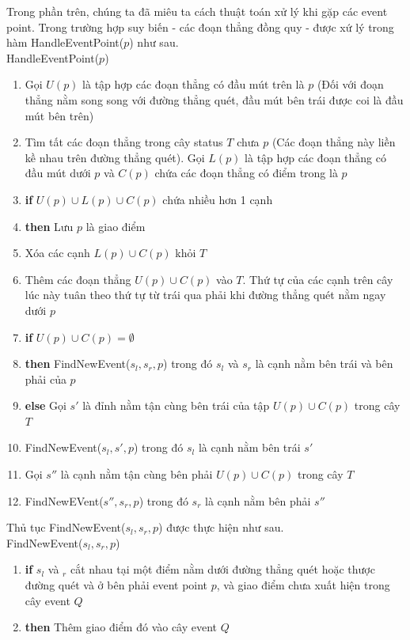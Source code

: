 \documentclass[15pt]{article}
\begin{document}
Trong phần trên, chúng ta đã miêu ta cách thuật toán xử lý khi gặp các event point. Trong trường hợp suy biến - các đoạn thẳng đồng quy - được xứ lý trong hàm HandleEventPoint($p$) như sau. \\

HandleEventPoint($p$)
\begin{enumerate}
\item Gọi $U(p)$ là tập hợp các đoạn thẳng có đầu mút trên là $p$ (Đối với đoạn thẳng nằm song song với đường thẳng quét, đầu mút bên trái được coi là đầu mút bên trên)
\item Tìm tất các đoạn thẳng trong cây status $T$ chưa $p$ (Các đoạn thẳng này liền kề nhau trên đường thẳng quét). Gọi $L(p)$ là tập hợp các đoạn thẳng có đầu mút dưới $p$ và $C(p)$ chứa các đoạn thẳng có điểm trong là $p$
\item \textbf{if} $U(p) \cup L(p) \cup C(p)$ chứa nhiều hơn 1 cạnh
\item \quad \textbf{then} Lưu $p$ là giao điểm
\item Xóa các cạnh $L(p) \cup C(p)$ khỏi $T$
\item Thêm các đoạn thẳng $U(p) \cup C(p)$ vào $T$. Thứ tự của các cạnh trên cây lúc này tuân theo thứ tự từ trái qua phải khi đường thẳng quét nằm ngay dưới $p$
\item \textbf{if} $U(p) \cup C(p) = \emptyset$
\item \quad \textbf{then} FindNewEvent($s_l, s_r, p$) trong đó $s_l$ và $s_r$ là cạnh nằm bên trái và bên phải của $p$
\item \textbf{else} Gọi $s'$ là đỉnh nằm tận cùng bên trái của tập $U(p) \cup C(p)$ trong cây $T$
\item \quad FindNewEvent($s_l, s', p$) trong đó $s_l$ là cạnh nằm bên trái $s'$
\item \quad Gọi $s''$ là cạnh nằm tận cùng bên phải $U(p) \cup C(p)$ trong cây $T$
\item \quad FindNewEVent($s'', s_r, p$) trong đó $s_r$ là cạnh nằm bên phải $s''$
\end{enumerate}

Thủ tục FindNewEvent($s_l, s_r, p$) được thực hiện như sau. \\

FindNewEvent($s_l, s_r, p$)
\begin{enumerate}
\item \textbf{if} $s_l$ và $_r$ cắt nhau tại một điểm nằm dưới đường thẳng quét hoặc thược đường quét và ở bên phải event point $p$, và giao điểm chưa xuất hiện trong cây event $Q$
\item \quad \textbf{then} Thêm giao điểm đó vào cây event $Q$
\end{enumerate}
\end{document}
